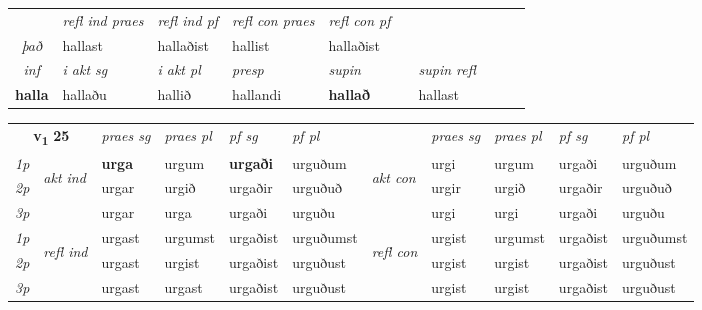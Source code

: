 \begin{tabular}{lllllllllll}
\cmidrule{3-6}
 & & \textit{refl ind praes} & \textit{refl ind pf} & \textit{refl con praes} & \textit{refl con pf} \\*
 \multicolumn{2}{c}{ \textit{það} }& hallast & hallaðist & hallist & hallaðist \\*

\cmidrule{3-8}
   \multicolumn{2}{c}{\textit{inf}}  & \textit{i akt sg} & \textit{i akt pl}   & \textit{presp} & \textit{supin} && \textit{supin refl}  \\*
  \multicolumn{2}{c}{\textbf{halla}} & hallaðu  & hallið   & hallandi &  \textbf{hallað} && hallast  \\*
\end{tabular}

\noindent
\begin{tabular}{lllllllllll} \toprule
\multicolumn{2}{c}{\textbf{v{\textsubscript{1}}} \Large{\textbf{25}}}  &  \textit{praes sg}  & \textit{praes pl}  &\textit{ pf sg} & \textit{pf pl} &  &  \textit{praes sg}  & \textit{praes pl}  & \textit{pf sg} & \textit{pf pl } \\*
	\cmidrule{3-6} \cmidrule{8-11}
 {\textit{1p}} & \multirow{3}{*}{\begin{turn}{90}\textit{akt ind}\end{turn}} & \textbf{urga} & urgum & \textbf{urgaði} & urguðum & \multirow{3}{*}{\begin{turn}{90}\textit{akt con}\end{turn}} &urgi & urgum & urgaði & urguðum\\*
 {\textit{2p}} &  &  urgar  & urgið & urgaðir & urguðuð & & urgir & urgið & urgaðir & urguðuð \\*
{\textit{3p}} &  & urgar & urga & urgaði & urguðu & & urgi & urgi& urgaði & urguðu \\*
\cmidrule{3-6} \cmidrule{8-11}
 {\textit{1p}} & \multirow{3}{*}{\begin{turn}{90}\textit{refl ind}\end{turn}}  & urgast & urgumst & urgaðist & urguðumst & \multirow{3}{*}{\begin{turn}{90}\textit{refl con}\end{turn}}  &urgist & urgumst & urgaðist & urguðumst \\*
 {\textit{2p}} &  & urgast & urgist & urgaðist & urguðust & &urgist & urgist & urgaðist & urguðust \\*
 {\textit{3p}}  & & urgast & urgast & urgaðist & urguðust & & urgist & urgist& urgaðist & urguðust \\*
\cmidrule{3-6} \cmidrule{8-11}


\end{tabular}
